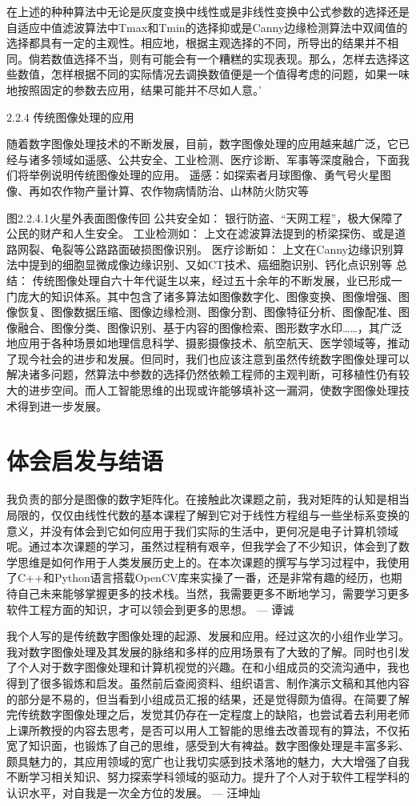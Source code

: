 	在上述的种种算法中无论是灰度变换中线性或是非线性变换中公式参数的选择还是自适应中值滤波算法中Tmax和Tmin的选择抑或是Canny边缘检测算法中双阈值的选择都具有一定的主观性。相应地，根据主观选择的不同，所导出的结果并不相同。倘若数值选择不当，则有可能会有一个糟糕的实现表现。那么，怎样去选择这些数值，怎样根据不同的实际情况去调换数值便是一个值得考虑的问题，如果一味地按照固定的参数去应用，结果可能并不尽如人意。'
	
2.2.4 传统图像处理的应用

	随着数字图像处理技术的不断发展，目前，数字图像处理的应用越来越广泛，它已经与诸多领域如遥感、公共安全、工业检测、医疗诊断、军事等深度融合，下面我们将举例说明传统图像处理的应用。
	遥感：如探索者月球图像、勇气号火星图像、再如农作物产量计算、农作物病情防治、山林防火防灾等

图2.2.4.1火星外表面图像传回
	公共安全如：
银行防盗、“天网工程”，极大保障了公民的财产和人生安全。
	工业检测如：
上文在滤波算法提到的桥梁探伤、或是道路网裂、龟裂等公路路面破损图像识别。	
	医疗诊断如：
上文在Canny边缘识别算法中提到的细胞显微成像边缘识别、又如CT技术、癌细胞识别、钙化点识别等
总结：
	传统图像处理自六十年代诞生以来，经过五十余年的不断发展，业已形成一门庞大的知识体系。其中包含了诸多算法如图像数字化、图像变换、图像增强、图像恢复、图像数据压缩、图像边缘检测、图像分割、图像特征分析、图像配准、图像融合、图像分类、图像识别、基于内容的图像检索、图形数字水印……，其广泛地应用于各种场景如地理信息科学、摄影摄像技术、航空航天、医学领域等，推动了现今社会的进步和发展。但同时，我们也应该注意到虽然传统数字图像处理可以解决诸多问题，然算法中参数的选择仍然依赖工程师的主观判断，可移植性仍有较大的进步空间。而人工智能思维的出现或许能够填补这一漏洞，使数字图像处理技术得到进一步发展。

\section{体会启发与结语}
	我负责的部分是图像的数字矩阵化。在接触此次课题之前，我对矩阵的认知是相当局限的，仅仅由线性代数的基本课程了解到它对于线性方程组与一些坐标系变换的意义，并没有体会到它如何应用于我们实际的生活中，更何况是电子计算机领域呢。通过本次课题的学习，虽然过程稍有艰辛，但我学会了不少知识，体会到了数学思维是如何作用于人类发展历史上的。在本次课题的撰写与学习过程中，我使用了C++和Python语言搭载OpenCV库来实操了一番，还是非常有趣的经历，也期待自己未来能够掌握更多的技术栈。当然，我需要更多不断地学习，需要学习更多软件工程方面的知识，才可以领会到更多的思想。
--- 谭诚

	我个人写的是传统数字图像处理的起源、发展和应用。经过这次的小组作业学习。我对数字图像处理及其发展的脉络和多样的应用场景有了大致的了解。同时也引发了个人对于数字图像处理和计算机视觉的兴趣。在和小组成员的交流沟通中，我也得到了很多锻炼和启发。虽然前后查阅资料、组织语言、制作演示文稿和其他内容的部分是不易的，但当看到小组成员汇报的结果，还是觉得颇为值得。在简要了解完传统数字图像处理之后，发觉其仍存在一定程度上的缺陷，也尝试着去利用老师上课所教授的内容去思考，是否可以用人工智能的思维去改善现有的算法，不仅拓宽了知识面，也锻炼了自己的思维，感受到大有裨益。数字图像处理是丰富多彩、颇具魅力的，其应用领域的宽广也让我切实感到技术落地的魅力，大大增强了自我不断学习相关知识、努力探索学科领域的驱动力。提升了个人对于软件工程学科的认识水平，对自我是一次全方位的发展。
--- 汪坤灿

